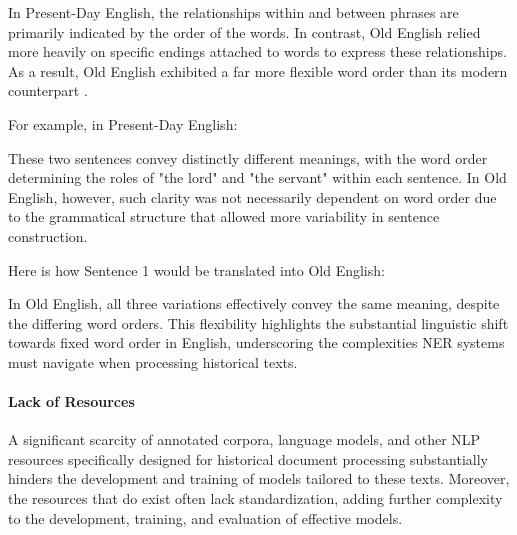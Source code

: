 In Present-Day English, the relationships within and between phrases are primarily indicated by the order of the words. In contrast, Old English relied more heavily on specific endings attached to words to express these relationships. As a result, Old English exhibited a far more flexible word order than its modern counterpart \citep{smith2013essentials}.

For example, in Present-Day English:


These two sentences convey distinctly different meanings, with the word order determining the roles of "the lord" and "the servant" within each sentence. In Old English, however, such clarity was not necessarily dependent on word order due to the grammatical structure that allowed more variability in sentence construction.

Here is how Sentence 1 would be translated into Old English:


In Old English, all three variations effectively convey the same meaning, despite the differing word orders. This flexibility highlights the substantial linguistic shift towards fixed word order in English, underscoring the complexities NER systems must navigate when processing historical texts.


\paragraph*{Lack of Resources}
\label{par:1_lack_of_resources}
A significant scarcity of annotated corpora, language models, and other NLP resources specifically designed for historical document processing substantially hinders the development and training of models tailored to these texts. Moreover, the resources that do exist often lack standardization, adding further complexity to the development, training, and evaluation of effective models.

